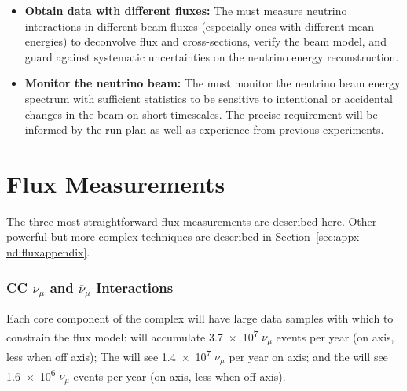 \begin{itemize}
    \item{{\bf Obtain data with different fluxes:}} The  must measure neutrino interactions in different beam fluxes (especially ones with different mean energies) to deconvolve flux and cross-sections, verify the beam model, and guard against systematic uncertainties on the neutrino energy reconstruction.
    
    \item{{\bf Monitor the neutrino beam:}} The  must monitor the neutrino beam energy spectrum with sufficient statistics to be sensitive to intentional or accidental changes in the beam on short timescales. The precise requirement will be informed by the run plan as well as experience from previous experiments. 
    
\end{itemize}

\section{Flux Measurements}

The three most straightforward flux measurements are described here. Other powerful but more complex techniques are described in Section~\ref{sec:appx-nd:fluxappendix}.

\subsubsection{CC $\nu_{\mu}$ and $\overline{\nu}_{\mu}$ Interactions}
Each core component of the  complex will have large data samples with which to constrain the flux model:   will accumulate \num{3.7e7}  $\nu_{\mu}$ events per year (on axis, less when off axis);  The  will see \num{1.4e7}  $\nu_{\mu}$ per year on axis; and the  will see \num{1.6e6}  $\nu_{\mu}$ events per year (on axis, less when off axis). 



